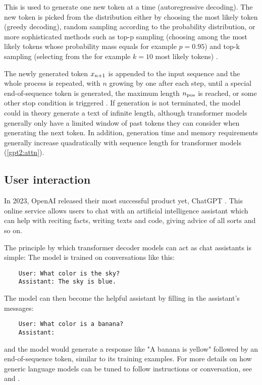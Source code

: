 This is used to generate one new token at a time (autoregressive decoding). The new token is picked from the distribution either by choosing the most likely token (greedy decoding), random sampling according to the probability distribution, or more sophisticated methods such as top-p sampling (choosing among the most likely tokens whose probability mass equals for example $p=0.95$) and top-k sampling (selecting from the for example $k=10$ most likely tokens) \cite{ippolito2019comparison}.

The newly generated token ${x}_{n+1}$ is appended to the input sequence and the whole process is repeated, with $n$ growing by one after each step, until a special end-of-sequence token is generated, the maximum length ${n_\textrm{pos}}$ is reached, or some other stop condition is triggered \cite[sect. "Generation"]{HuggingFaceGPT2}. If generation is not terminated, the model could in theory generate a text of infinite length, although transformer models generally only have a limited window of past tokens they can consider when generating the next token. In addition, generation time and memory requirements generally increase quadratically with sequence length for transformer models (\cref{gpt2:attn}).

\subsection{User interaction}

In 2023, OpenAI released their most successful product yet, ChatGPT \cite{openai_chatgpt_2022}. This online service allows users to chat with an artificial intelligence assistant which can help with reciting facts, writing texts and code, giving advice of all sorts and so on.

The principle by which transformer decoder models can act as chat assistants is simple: The model is trained on conversations like this:

\begin{verbatim}
    User: What color is the sky?
    Assistant: The sky is blue.
\end{verbatim}

The model can then become the helpful assistant by filling in the assistant's messages:

\begin{verbatim}
    User: What color is a banana?
    Assistant:
\end{verbatim}

and the model would generate a response like "A banana is yellow" followed by an end-of-sequence token, similar to its training examples. For more details on how generic language models can be tuned to follow instructions or conversation, see \cite{yi2019coherent} and \cite{ouyang2022training}.

